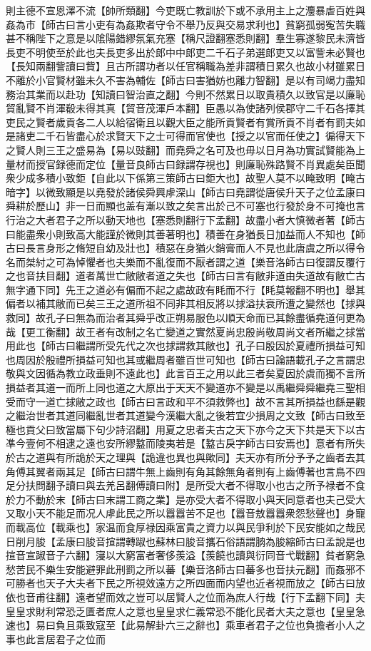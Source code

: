 則主德不宣恩澤不流【帥所類翻】今吏既亡教訓於下或不承用主上之灋暴虐百姓與姦為市【師古曰言小吏有為姦欺者守令不舉乃反與交易求利也】貧窮孤弱寃苦失職甚不稱陛下之意是以隂陽錯繆氛氣充塞【稱尺證翻塞悉則翻】羣生寡遂黎民未濟皆長吏不明使至於此也夫長吏多出於郎中中郎吏二千石子弟選郎吏又以富訾未必賢也【長知兩翻訾讀曰貲】且古所謂功者以任官稱職為差非謂積日累久也故小材雖累日不離於小官賢材雖未久不害為輔佐【師古曰害猶妨也離力智翻】是以有司竭力盡知務治其業而以赴功【知讀曰智治直之翻】今則不然累日以取貴積久以致官是以廉恥貿亂賢不肖渾殽未得其真【貿音茂渾戶本翻】臣愚以為使諸列侯郡守二千石各擇其吏民之賢者歲貢各二人以給宿衛且以觀大臣之能所貢賢者有賞所貢不肖者有罰夫如是諸吏二千石皆盡心於求賢天下之士可得而官使也【授之以官而任使之】徧得天下之賢人則三王之盛易為【易以豉翻】而堯舜之名可及也毋以日月為功實試賢能為上量材而授官録德而定位【量音良師古曰録謂存視也】則廉恥殊路賢不肖異處矣臣聞衆少成多積小致鉅【自此以下係第三策師古曰鉅大也】故聖人莫不以晻致明【晻古暗字】以微致顯是以堯發於諸侯舜興虖深山【師古曰堯謂從唐侯升天子之位孟康曰舜耕於歷山】非一日而顯也盖有漸以致之矣言出於己不可塞也行發於身不可掩也言行治之大者君子之所以動天地也【塞悉則翻行下孟翻】故盡小者大慎微者著【師古曰能盡衆小則致高大能謹於微則其善著明也】積善在身猶長日加益而人不知也【師古曰長言身形之脩短自幼及壯也】積惡在身猶火銷膏而人不見也此唐虞之所以得令名而桀紂之可為悼懼者也夫樂而不亂復而不厭者謂之道【樂音洛師古曰復謂反覆行之也音扶目翻】道者萬世亡敝敝者道之失也【師古曰言有敝非道由失道故有敝亡古無字通下同】先王之道必有偏而不起之處故政有眊而不行【眊莫報翻不明也】舉其偏者以補其敝而已矣三王之道所祖不同非其相反將以捄溢扶衰所遭之變然也【捄與救同】故孔子曰無為而治者其舜乎改正朔易服色以順天命而已其餘盡循堯道何更為哉【更工衡翻】故王者有改制之名亡變道之實然夏尚忠殷尚敬周尚文者所繼之捄當用此也【師古曰繼謂所受先代之次也捄謂救其敝也】孔子曰殷因於夏禮所損益可知也周因於殷禮所損益可知也其或繼周者雖百世可知也【師古曰論語載孔子之言謂忠敬與文因循為教立政垂則不遠此也】此言百王之用以此三者矣夏因於虞而獨不言所損益者其道一而所上同也道之大原出于天天不變道亦不變是以禹繼舜舜繼堯三聖相受而守一道亡捄敝之政也【師古曰言政和平不須救弊也】故不言其所損益也繇是觀之繼治世者其道同繼亂世者其道變今漢繼大亂之後若宜少損周之文致【師古曰致至極也貢父曰致當屬下句少詩沼翻】用夏之忠者夫古之天下亦今之天下共是天下以古凖今壹何不相逮之遠也安所繆盭而陵夷若是【盭古戾字師古曰安焉也】意者有所失於古之道與有所詭於天之理與【詭違也異也與歟同】夫天亦有所分予予之齒者去其角傅其翼者兩其足【師古曰謂牛無上齒則有角其餘無角者則有上齒傅著也言鳥不四足分扶問翻予讀曰與去羌呂翻傅讀曰附】是所受大者不得取小也古之所予禄者不食於力不動於末【師古曰末謂工商之業】是亦受大者不得取小與天同意者也夫己受大又取小天不能足而况人虖此民之所以囂囂苦不足也【囂音敖囂囂衆怨愁聲也】身寵而載高位【載乘也】家温而食厚禄因乘富貴之資力以與民爭利於下民安能如之哉民日削月朘【孟康曰朘音揎謂轉踧也蘇林曰朘音攜石俗語謂朒為朘縮師古曰孟說是也揎音宣踧音子六翻】寖以大窮富者奢侈羨溢【羨饒也讀與衍同音弋戰翻】貧者窮急愁苦民不樂生安能避罪此刑罰之所以蕃【樂音洛師古曰蕃多也音扶元翻】而姦邪不可勝者也天子大夫者下民之所視效遠方之所四面而内望也近者視而放之【師古曰放依也音甫往翻】遠者望而效之豈可以居賢人之位而為庶人行哉【行下孟翻下同】夫皇皇求財利常恐乏匱者庶人之意也皇皇求仁義常恐不能化民者大夫之意也【皇皇急速也】易曰負且乘致寇至【此易解卦六三之辭也】乘車者君子之位也負擔者小人之事也此言居君子之位而